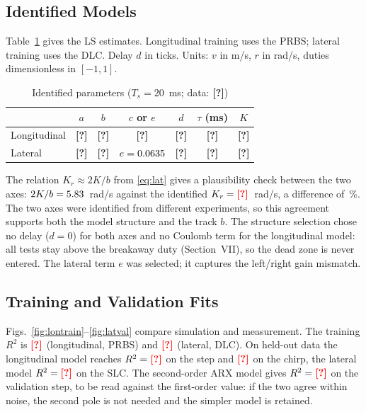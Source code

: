 \documentclass[conference]{IEEEtran}\newcommand{\haveieee}{}%
\newcommand{\todo}[1]{{\color{red}\textbf{[#1]}}}
\providecommand{\DataSource}{\todo{?}}
\providecommand{\TsMs}{20}
\newcommand{\fallbackmacros}{\todo{?}}
\providecommand{\LonA}{\fallbackmacros}\providecommand{\LonB}{\fallbackmacros}
\providecommand{\LonC}{\fallbackmacros}\providecommand{\LonDelay}{\fallbackmacros}
\providecommand{\LonTauMs}{\fallbackmacros}\providecommand{\LonK}{\fallbackmacros}
\providecommand{\LatA}{\fallbackmacros}\providecommand{\LatB}{\fallbackmacros}
\providecommand{\LatDelay}{\fallbackmacros}\providecommand{\LatTauMs}{\fallbackmacros}
\providecommand{\LatK}{\fallbackmacros}
\providecommand{\RtwoLonTrain}{\fallbackmacros}\providecommand{\RtwoLonValStep}{\fallbackmacros}
\providecommand{\RtwoLonValSine}{\fallbackmacros}\providecommand{\RtwoLatTrain}{\fallbackmacros}
\providecommand{\RtwoLatVal}{\fallbackmacros}\providecommand{\RtwoLonArxTwoVal}{\fallbackmacros}
\begin{document}
\subsection{Identified Models}
Table~\ref{tab:par} gives the LS estimates. Longitudinal training uses the PRBS; lateral training uses the DLC. Delay $d$ in ticks. Units: $v$ in m/s, $r$ in rad/s, duties dimensionless in $[-1,1]$.
\begin{table}[!t]
\caption{Identified parameters ($T_s=\TsMs$~ms; data: \DataSource)}
\label{tab:par}
\centering\footnotesize
\begin{tabular}{@{}lcccccc@{}}
\toprule
 & $a$ & $b$ & $c$ or $e$ & $d$ & $\tau$ (ms) & $K$\\
\midrule
Longitudinal & \LonA & \LonB & \LonC & \LonDelay & \LonTauMs & \LonK\\
Lateral & \LatA & \LatB & $e=0.0635$ & \LatDelay & \LatTauMs & \LatK\\
\bottomrule
\end{tabular}
\end{table}
The relation $K_r\approx2K/b$ from \eqref{eq:lat} gives a plausibility check between the two axes: $2K/b=5.83$~rad/s against the identified $K_r=\LatK$~rad/s, a difference of \LatKcheckPct\,\%. The two axes were identified from different experiments, so this agreement supports both the model structure and the track $b$. The structure selection chose no delay ($d=0$) for both axes and no Coulomb term for the longitudinal model: all tests stay above the breakaway duty (Section~VII), so the dead zone is never entered. The lateral term $e$ was selected; it captures the left/right gain mismatch.

\subsection{Training and Validation Fits}
Figs.~\ref{fig:lontrain}--\ref{fig:latval} compare simulation and measurement. The training $R^2$ is $\RtwoLonTrain$ (longitudinal, PRBS) and $\RtwoLatTrain$ (lateral, DLC). On held-out data the longitudinal model reaches $R^2=\RtwoLonValStep$ on the step and $\RtwoLonValSine$ on the chirp, the lateral model $R^2=\RtwoLatVal$ on the SLC. The second-order ARX model gives $R^2=\RtwoLonArxTwoVal$ on the validation step, to be read against the first-order value: if the two agree within noise, the second pole is not needed and the simpler model is retained.
\end{document}
